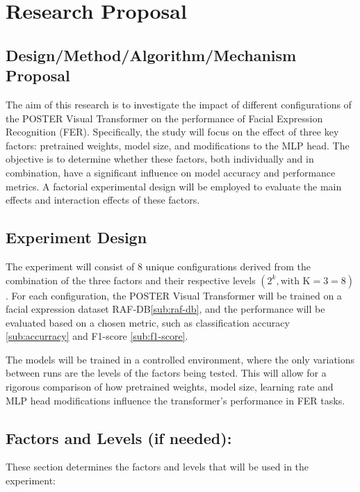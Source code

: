 \chapter{Research Proposal}
\label{chapter:research-proposal}

\section{Design/Method/Algorithm/Mechanism Proposal}

The aim of this research is to investigate the impact of different configurations of the POSTER Visual Transformer on the performance of Facial Expression Recognition (FER). Specifically, the study will focus on the effect of three key factors: pretrained weights, model size, and modifications to the MLP head. The objective is to determine whether these factors, both individually and in combination, have a significant influence on model accuracy and performance metrics. A factorial experimental design will be employed to evaluate the main effects and interaction effects of these factors.
 

\section{Experiment Design}
\label{section:experiment-design}
The experiment will consist of 8 unique configurations derived from the combination of the three factors and their respective levels $(2^k, \text{with K} = 3 = 8)$. For each configuration, the POSTER Visual Transformer will be trained on a facial expression dataset RAF-DB\ref{sub:raf-db}, and the performance will be evaluated based on a chosen metric, such as classification accuracy \ref{sub:accurracy} and F1-score \ref{sub:f1-score}.

The models will be trained in a controlled environment, where the only variations between runs are the levels of the factors being tested. This will allow for a rigorous comparison of how pretrained weights, model size, learning rate and MLP head modifications influence the transformer’s performance in FER tasks.

\section{Factors and Levels (if needed):}
These section determines the  factors and levels that will be used in the experiment:



